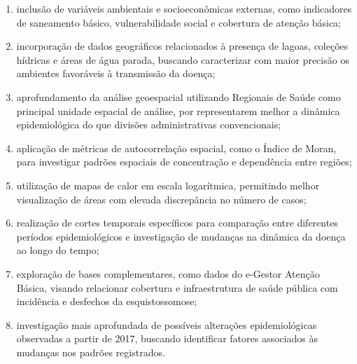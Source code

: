 \documentclass[11pt,a4paper]{article}
\begin{document}
\begin{enumerate}
    \item inclusão de variáveis ambientais e socioeconômicas externas, como indicadores de saneamento básico, vulnerabilidade social e cobertura de atenção básica;

    \item incorporação de dados geográficos relacionados à presença de lagoas, coleções hídricas e áreas de água parada, buscando caracterizar com maior precisão os ambientes favoráveis à transmissão da doença;

    \item aprofundamento da análise geoespacial utilizando Regionais de Saúde como principal unidade espacial de análise, por representarem melhor a dinâmica epidemiológica do que divisões administrativas convencionais;

    \item aplicação de métricas de autocorrelação espacial, como o Índice de Moran, para investigar padrões espaciais de concentração e dependência entre regiões;

    \item utilização de mapas de calor em escala logarítmica, permitindo melhor visualização de áreas com elevada discrepância no número de casos;

    \item realização de cortes temporais específicos para comparação entre diferentes períodos epidemiológicos e investigação de mudanças na dinâmica da doença ao longo do tempo;

    \item exploração de bases complementares, como dados do e-Gestor Atenção Básica, visando relacionar cobertura e infraestrutura de saúde pública com incidência e desfechos da esquistossomose;

    \item investigação mais aprofundada de possíveis alterações epidemiológicas observadas a partir de 2017, buscando identificar fatores associados às mudanças nos padrões registrados.
\end{enumerate}
\end{document}
